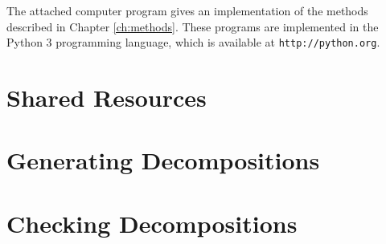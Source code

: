 The attached computer program gives an implementation of the methods described in Chapter \ref{ch:methods}.
These programs are implemented in the Python 3 programming language, which is available at \verb~http://python.org~.

\section{Shared Resources}

{\footnotesize }

\section{Generating Decompositions}

{\footnotesize }

\section{Checking Decompositions}

{\footnotesize }
